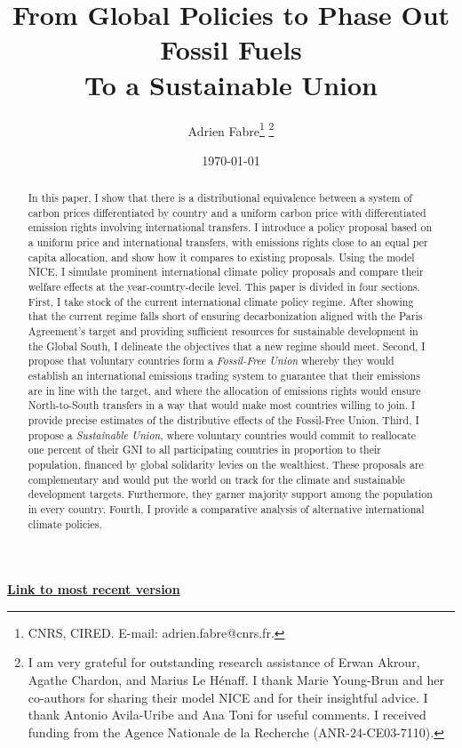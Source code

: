 \documentclass[12pt,english]{article}
\title{From Global Policies to Phase Out Fossil Fuels\\To a Sustainable Union}
\author{Adrien Fabre\footnote{CNRS, CIRED. E-mail: adrien.fabre@cnrs.fr.} \footnote{I am very grateful for outstanding research assistance of Erwan Akrour, Agathe Chardon, and Marius Le Hénaff. I thank Marie Young-Brun and her co-authors for sharing their model NICE and for their insightful advice. I thank Antonio Avila-Uribe and Ana Toni for useful comments. I received funding from the Agence Nationale de la Recherche (ANR-24-CE03-7110).}}
\date{\today} %
\newcommand{\bo}[1]{\textbf{#1}}
\begin{document}
\sloppy
\maketitle

\begin{center}
{\bo{\href{https://github.com/bixiou/global_tax_attitudes/raw/main/paper/global_climate_policies.pdf}{Link to most recent version}}}
\end{center}


\begin{abstract}

In this paper, I show that there is a distributional equivalence between a system of carbon prices differentiated by country and a uniform carbon price with differentiated emission rights involving international transfers. I introduce a policy proposal based on a uniform price and international transfers, with emissions rights close to an equal per capita allocation, and show how it compares to existing proposals. Using the model NICE, I simulate prominent international climate policy proposals and compare their welfare effects at the year-country-decile level. 
This paper is divided in four sections. First, I take stock of the current international climate policy regime. After showing that the current regime falls short of ensuring decarbonization aligned with the Paris Agreement's target and providing sufficient resources for sustainable development in the Global South, I delineate the objectives that a new regime should meet. Second, I propose that voluntary countries form a \textit{Fossil-Free Union} whereby they would establish an international emissions trading system to guarantee that their emissions are in line with the target, and where the allocation of emissions rights would ensure North-to-South transfers in a way that would make most countries willing to join. I provide precise estimates of the distributive effects of the Fossil-Free Union. Third, I propose a \textit{Sustainable Union}, where voluntary countries would commit to reallocate one percent of their GNI to all participating countries in proportion to their population, financed by global solidarity levies on the wealthiest. These proposals are complementary and would put the world on track for the climate and sustainable development targets. Furthermore, they garner majority support among the population in every country. Fourth, I provide a comparative analysis of alternative international climate policies.


\end{abstract}
\end{document}
